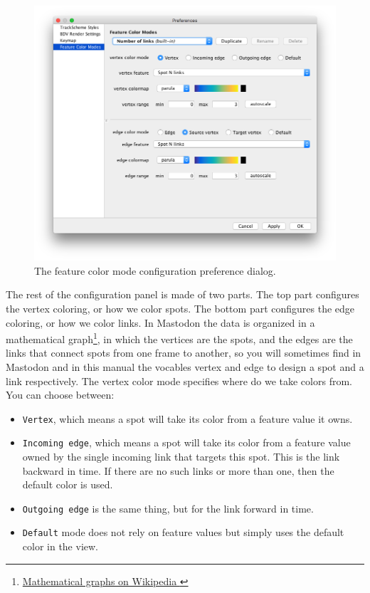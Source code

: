 \begin{figure}
    \centering
    \includegraphics[height=0.3\textheight]{figures/Mastodon_FeatureColorModeConfig_1.png}
    
    \caption{The feature color mode configuration preference dialog. }
    \label{fig:FeatureColorModeConfig1}
\end{figure}

The rest of the configuration panel is made of two parts.
The top part configures the vertex coloring, or how we color spots.
The bottom part configures the edge coloring, or how we color links. 
In Mastodon the data is organized in a mathematical graph\footnote{\href{https://en.wikipedia.org/wiki/Graph_(discrete_mathematics)}{Mathematical graphs on Wikipedia }}, in which the vertices are the spots, and the edges are the links that connect spots from one frame to another, so you will sometimes find in Mastodon and in this manual the vocables vertex and edge to design a spot and a link respectively. 
The vertex color mode specifies where do we take colors from. 
You can choose between:
\begin{itemize}
    \item \texttt{Vertex}, which means a spot will take its color from a feature value it owns.
    \item \texttt{Incoming edge}, which means a spot will take its color from a feature value owned by the single incoming link that targets this spot. This is the link backward in time. If there are no such links or more than one, then the default color is used.
    \item \texttt{Outgoing edge} is the same thing, but for the link forward in time. 
    \item \texttt{Default} mode does not rely on feature values but simply uses the default color in the view.
\end{itemize}

